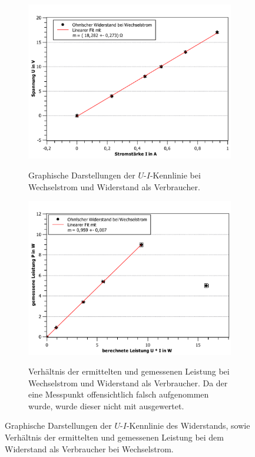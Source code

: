 \begin{figure}[ht]
	\label{fig:R_wechsel}
	\centering	
	\begin{subfigure}{0.70\textwidth}
		\centering
		\includegraphics[width=\textwidth]{auswertung/widerstand_wechselstrom_Widerstand.pdf}
		\label{fig:3}
		\caption{Graphische Darstellungen der $U$-$I$-Kennlinie bei Wechselstrom und Widerstand als Verbraucher.}	
	\end{subfigure}
	\begin{subfigure}{0.70\textwidth}
		\centering
		\includegraphics[width=\textwidth]{auswertung/widerstand_wechselstrom_Leistung.pdf}
		\label{fig:4}
		\caption{Verhältnis der ermittelten und gemessenen Leistung bei Wechselstrom und Widerstand als Verbraucher. Da der eine Messpunkt offensichtlich falsch aufgenommen wurde, wurde dieser nicht mit ausgewertet.}	
	\end{subfigure}
	\caption{Graphische Darstellungen der $U$-$I$-Kennlinie des Widerstands, sowie Verhältnis der ermittelten und gemessenen Leistung bei dem Widerstand als Verbraucher bei Wechselstrom.}
\end{figure}
